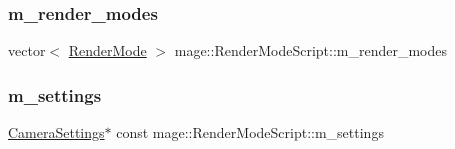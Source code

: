 \subsubsection{\texorpdfstring{m\+\_\+render\+\_\+modes}{m\_render\_modes}}
{\footnotesize\ttfamily vector$<$ \hyperlink{namespacemage_a5e7e18b0154373ce8fc942fe3f6b27fd}{Render\+Mode} $>$ mage\+::\+Render\+Mode\+Script\+::m\+\_\+render\+\_\+modes\hspace{0.3cm}{\ttfamily [private]}}

\hypertarget{classmage_1_1_render_mode_script_a536b13e61daa6faa3528f65d29fb252f}{}\label{classmage_1_1_render_mode_script_a536b13e61daa6faa3528f65d29fb252f} 
\subsubsection{\texorpdfstring{m\+\_\+settings}{m\_settings}}
{\footnotesize\ttfamily \hyperlink{classmage_1_1_camera_settings}{Camera\+Settings}$\ast$ const mage\+::\+Render\+Mode\+Script\+::m\+\_\+settings\hspace{0.3cm}{\ttfamily [private]}}


